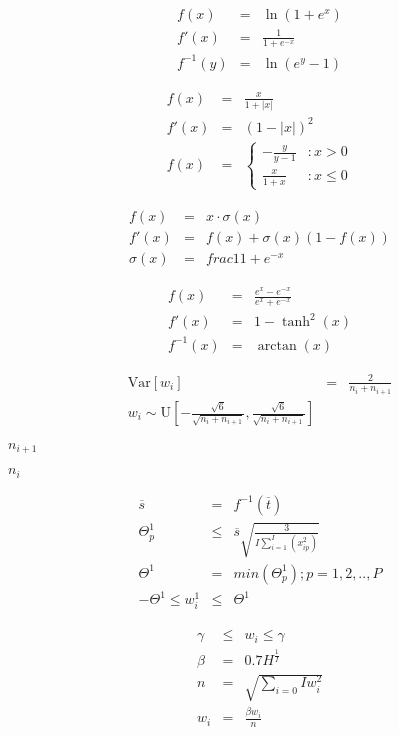 \documentclass{article}
\begin{document}
\begin{eqnarray*} f(x) &=& \ln(1 + e^{x}) \\ f'(x) &=& \frac{1}{1 + e^{-x}} \\ f^{-1}(y) &=& \ln(e^{y} - 1) \end{eqnarray*}
\pagebreak

\begin{eqnarray*} f(x) &=& \frac{x}{1 + |x|} \\ f'(x) &=& (1 - |x|)^2 \\ f(x) &=& \left\{ \begin{array}{lr} -\frac{y}{y-1} & : x > 0 \\ \frac{x}{1 + x} & : x \le 0 \end{array} \right. \end{eqnarray*}
\pagebreak

\begin{eqnarray*} f(x) &=& x \cdot \sigma(x) \\ f'(x) &=& f(x) + \sigma(x) (1 - f(x)) \\ \sigma(x) &=& frac{1}{1 + e^{-x}} \end{eqnarray*}
\pagebreak

\begin{eqnarray*} f(x) &=& \frac{e^x - e^{-x}}{e^x + e^{-x}} \\ f'(x) &=& 1 - \tanh^2(x) \\ f^{-1}(x) &=& \arctan(x) \end{eqnarray*}
\pagebreak

\begin{eqnarray*} \mathrm{Var}[w_i] &=& \frac{2}{n_i + n_{i+1}} \\ w_i \sim \mathrm{U}[-\frac{\sqrt{6}}{\sqrt{n_i + n_{i+1}}}, \frac{\sqrt{6}}{\sqrt{n_i + n_{i+1}}}] \end{eqnarray*}
\pagebreak

$ n_{i+1} $
\pagebreak

$ n_i $
\pagebreak

\begin{eqnarray*} \overline{s} &=& f^{-1}(\overline{t}) \\ \Theta^{1}_{p} &\le& \overline{s} \sqrt{\frac{3}{I \sum_{i = 1}^{I} (x_{ip}^2)}} \\ \Theta^1 &=& min(\Theta_{p}^{1}); p=1,2,..,P \\ -\Theta^{1} \le w_{i}^{1} &\le& \Theta^{1} \end{eqnarray*}
\pagebreak

\begin{eqnarray*} \gamma &\le& w_i \le \gamma \\ \beta &=& 0.7H^{\frac{1}{I}} \\ n &=& \sqrt{\sum_{i=0}{I}w_{i}^{2}} \\ w_i &=& \frac{\beta w_i}{n} \end{eqnarray*}
\pagebreak
\end{document}

